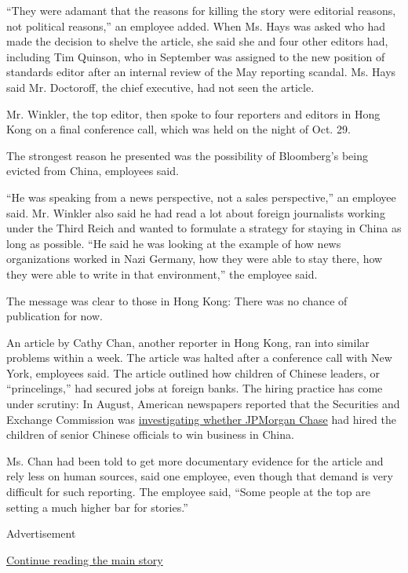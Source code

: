 ``They were adamant that the reasons for killing the story were
editorial reasons, not political reasons,'' an employee added. When Ms.
Hays was asked who had made the decision to shelve the article, she said
she and four other editors had, including Tim Quinson, who in September
was assigned to the new position of standards editor after an internal
review of the May reporting scandal. Ms. Hays said Mr. Doctoroff, the
chief executive, had not seen the article.

Mr. Winkler, the top editor, then spoke to four reporters and editors in
Hong Kong on a final conference call, which was held on the night of
Oct. 29.

The strongest reason he presented was the possibility of Bloomberg's
being evicted from China, employees said.

``He was speaking from a news perspective, not a sales perspective,'' an
employee said. Mr. Winkler also said he had read a lot about foreign
journalists working under the Third Reich and wanted to formulate a
strategy for staying in China as long as possible. ``He said he was
looking at the example of how news organizations worked in Nazi Germany,
how they were able to stay there, how they were able to write in that
environment,'' the employee said.

The message was clear to those in Hong Kong: There was no chance of
publication for now.

An article by Cathy Chan, another reporter in Hong Kong, ran into
similar problems within a week. The article was halted after a
conference call with New York, employees said. The article outlined how
children of Chinese leaders, or ``princelings,'' had secured jobs at
foreign banks. The hiring practice has come under scrutiny: In August,
American newspapers reported that the Securities and Exchange Commission
was
\href{http://dealbook.nytimes3xbfgragh.onion/2013/08/20/many-wall-st-banks-woo-children-of-chinese-leaders/?_r=0}{investigating
whether JPMorgan Chase} had hired the children of senior Chinese
officials to win business in China.

Ms. Chan had been told to get more documentary evidence for the article
and rely less on human sources, said one employee, even though that
demand is very difficult for such reporting. The employee said, ``Some
people at the top are setting a much higher bar for stories.''

Advertisement

\protect\hyperlink{after-bottom}{Continue reading the main story}


